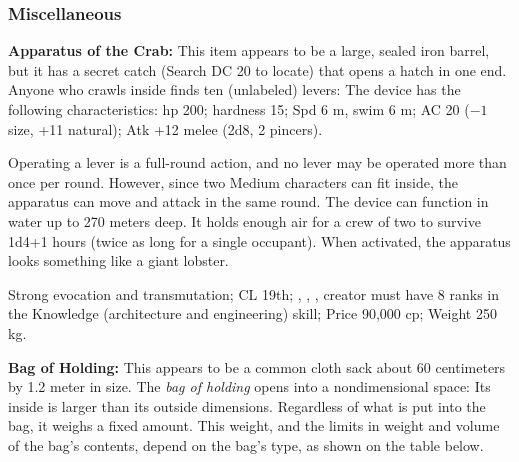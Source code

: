 \subsubsection{Miscellaneous}



\textbf{Apparatus of the Crab:} This item appears to be a large, sealed iron barrel, but it has a secret catch (Search DC 20 to locate) that opens a hatch in one end. Anyone who crawls inside finds ten (unlabeled) levers: The device has the following characteristics: hp 200; hardness 15; Spd 6 m, swim 6 m; AC 20 ($-1$ size, +11 natural); Atk +12 melee (2d8, 2 pincers).


Operating a lever is a full-round action, and no lever may be operated more than once per round. However, since two Medium characters can fit inside, the apparatus can move and attack in the same round. The device can function in water up to 270 meters deep. It holds enough air for a crew of two to survive 1d4+1 hours (twice as long for a single occupant). When activated, the apparatus looks something like a giant lobster.

Strong evocation and transmutation; CL 19th; , , , creator must have 8 ranks in the Knowledge (architecture and engineering) skill; Price 90,000 cp; Weight 250 kg.



\textbf{Bag of Holding:} This appears to be a common cloth sack about 60 centimeters by 1.2 meter in size. The \emph{bag of holding} opens into a nondimensional space: Its inside is larger than its outside dimensions. Regardless of what is put into the bag, it weighs a fixed amount. This weight, and the limits in weight and volume of the bag's contents, depend on the bag's type, as shown on the table below.


